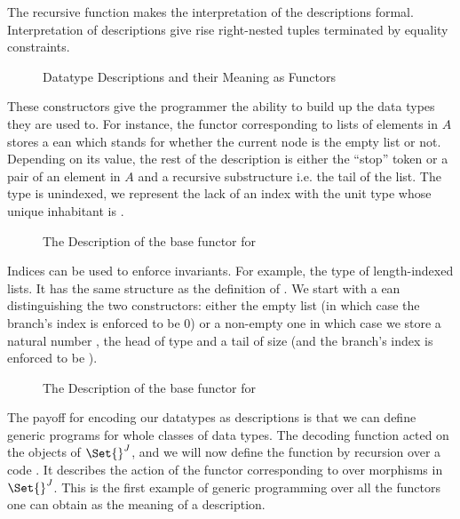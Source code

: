 The recursive function  makes the interpretation of the
descriptions formal. Interpretation of descriptions give rise
right-nested tuples terminated by equality constraints.

\begin{figure}[h]
\begin{minipage}{0.45\textwidth}
\end{minipage}\hfill
\begin{minipage}{0.45\textwidth}
\end{minipage}
\caption{Datatype Descriptions and their Meaning as Functors}
\label{figure:desc}
\end{figure}

These constructors give the programmer the ability to build up the data
types they are used to. For instance, the functor corresponding
to lists of elements in $A$ stores a ean which stands for whether
the current node is the empty list or not. Depending on its value, the
rest of the description is either the ``stop'' token or a pair of an element
in $A$ and a recursive substructure i.e. the tail of the list. The  type
is unindexed, we represent the lack of an index with the unit type \AD{$\top$}
whose unique inhabitant is .

\begin{figure}[h]
\caption{The Description of the base functor for  }\label{figure:listD}
\end{figure}

Indices can be used to enforce invariants. For example, the type {  }
of length-indexed lists. It has the same structure as the definition of .
We start with a ean distinguishing the two constructors: either
the empty list (in which case the branch's index is enforced to be $0$) or a
non-empty one in which case we store a natural number , the head of type
 and a tail of size  (and the branch's index is enforced to be
 ).

\begin{figure}[h]
\caption{The Description of the base functor for   }\label{figure:vecD}
\end{figure}

The payoff for encoding our datatypes as descriptions is that we can define
generic programs for whole classes of data types. The decoding function 
acted on the objects of $\Set{}^J$, and we will now define the function  by
recursion over a code . It describes the action of the functor corresponding
to  over morphisms in $\Set{}^J$. This is the first example of generic
programming over all the functors one can obtain as the meaning of a description.

